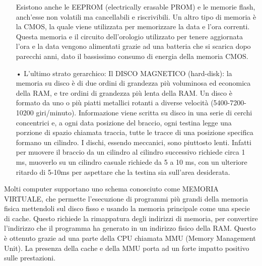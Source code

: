 \documentclass{article}
\begin{document}
\begin{enumerate}
Esistono anche le EEPROM (electrically erasable PROM) e le memorie flash, anch’esse non volatili ma cancellabili e riscrivibili. Un altro tipo di memoria è la CMOS, la quale viene utilizzata per memorizzare la data e l’ora correnti. Questa memoria e il circuito dell’orologio utilizzato per tenere aggiornata l’ora e la data vengono alimentati grazie ad una batteria che si scarica dopo parecchi anni, dato il bassissimo consumo di energia della memoria CMOS.
   \item[•] L’ultimo strato gerarchico: Il DISCO MAGNETICO (hard-disk):
la memoria su disco è di due ordini di grandezza più voluminosa ed economica della RAM, e tre ordini di grandezza più lenta della RAM.
Un disco è formato da uno o più piatti metallici rotanti a diverse velocità (5400-7200-10200 giri/minuto). Informazione viene scritta su disco in una serie di cerchi concentrici e, a ogni data posizione del braccio, ogni testina legge una porzione di spazio chiamata traccia, tutte le tracce di una posizione specifica formano un cilindro. I dischi, essendo meccanici, sono piuttosto lenti. Infatti per muovere il braccio da un cilindro al cilindro successivo richiede circa 1 ms, muoverlo su un cilindro casuale richiede da 5 a 10 ms, con un ulteriore ritardo di 5-10ms per aspettare che la testina sia sull’area desiderata.
\end{enumerate}
Molti computer supportano uno schema conosciuto come MEMORIA VIRTUALE, che permette l’esecuzione di programmi più grandi della memoria fisica mettendoli sul disco fisso e usando la memoria principale come una specie di cache. Questo richiede la rimappatura degli indirizzi di memoria, per convertire l’indirizzo che il programma ha generato in un indirizzo fisico della RAM. Questo è ottenuto grazie ad una parte della CPU chiamata MMU (Memory Management Unit). La presenza della cache e della MMU porta ad un forte impatto positivo sulle prestazioni.
\end{document}
